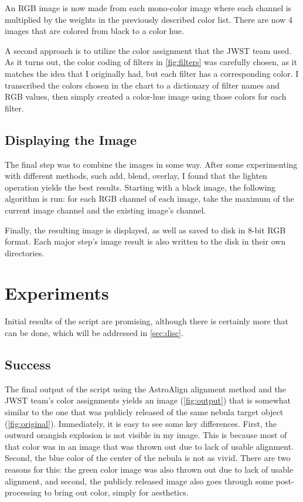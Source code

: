 \documentclass[10pt,twocolumn,letterpaper]{article}
\begin{document}
An RGB image is now made from each mono-color image where each channel is multiplied by the weights in the previously described color list. There are now 4 images that are colored from black to a color hue.

A second approach is to utilize the color assignment that the JWST team used. As it turns out, the color coding of filters in \cref{fig:filters} was carefully chosen, as it matches the idea that I originally had, but each filter has a corresponding color. I transcribed the colors chosen in the chart to a dictionary of filter names and RGB values, then simply created a color-hue image using those colors for each filter.

\subsection{Displaying the Image}

The final step was to combine the images in some way. After some experimenting with different methods, such add, blend, overlay, I found that the lighten operation yields the best results. Starting with a black image, the following algorithm is run: for each RGB channel of each image, take the maximum of the current image channel and the existing image's channel.

Finally, the resulting image is displayed, as well as saved to disk in 8-bit RGB format. Each major step's image result is also written to the disk in their own directories.

\section{Experiments}
\label{sec:exp}

Initial results of the script are promising, although there is certainly more that can be done, which will be addressed in \cref{sec:disc}.

\subsection{Success}

The final output of the script using the AstroAlign alignment method and the JWST team's color assignments yields an image (\cref{fig:output}) that is somewhat similar to the one that was publicly released of the same nebula target object (\cref{fig:original}). Immediately, it is easy to see some key differences. First, the outward orangish explosion is not visible in my image. This is because most of that color was in an image that was thrown out due to lack of usable alignment. 
Second, the blue color of the center of the nebula is not as vivid. There are two reasons for this: the green color image was also thrown out due to lack of usable alignment, and second, the publicly released image also goes through some post-processing to bring out color, simply for aesthetics.
\end{document}
